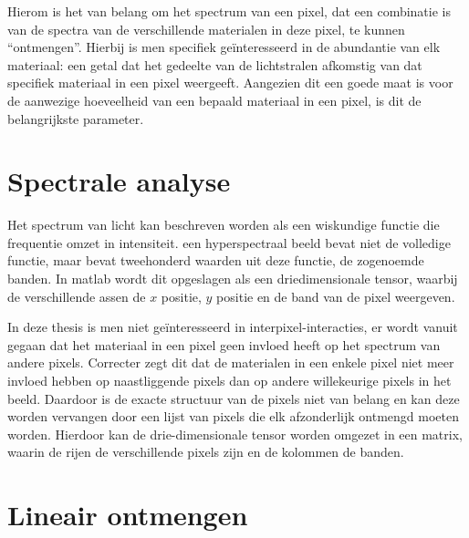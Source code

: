 \documentclass[12pt]{report}
\begin{document}
Hierom is het van belang om het spectrum van een pixel, dat een combinatie is van de spectra van de verschillende materialen in deze pixel, te kunnen ``ontmengen''. Hierbij is men specifiek ge\"interesseerd in de abundantie van elk materiaal: een getal dat het gedeelte van de lichtstralen afkomstig van dat specifiek materiaal in een pixel weergeeft. Aangezien dit een goede maat is voor de aanwezige hoeveelheid van een bepaald materiaal in een pixel, is dit de belangrijkste parameter.

\section{Spectrale analyse}

Het spectrum van licht kan beschreven worden als een wiskundige functie die frequentie omzet in intensiteit. een hyperspectraal beeld bevat niet de volledige functie, maar bevat tweehonderd waarden uit deze functie, de zogenoemde banden. In matlab\citep{MATLAB} wordt dit opgeslagen als een driedimensionale tensor, waarbij de verschillende assen de $x$ positie, $y$ positie en de band van de pixel weergeven. 

In deze thesis is men niet ge\"interesseerd in interpixel-interacties, er wordt vanuit gegaan dat het materiaal in een pixel geen invloed heeft op het spectrum van andere pixels. Correcter zegt dit dat de materialen in een enkele pixel niet meer invloed hebben op naastliggende pixels dan op andere willekeurige pixels in het beeld. Daardoor is de exacte structuur van de pixels niet van belang en kan deze worden vervangen door een lijst van pixels die elk afzonderlijk ontmengd moeten worden.  Hierdoor kan de drie-dimensionale tensor worden omgezet in een matrix, waarin de rijen de verschillende pixels zijn en de kolommen de banden.  






\section{Lineair ontmengen}
\end{document}
